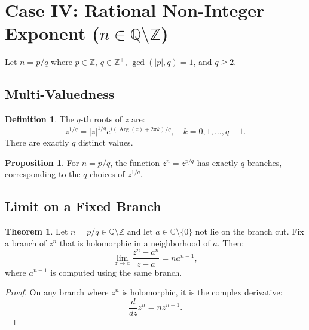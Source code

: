 \documentclass{article}
\theoremstyle{definition}
\newtheorem{definition}{Definition}[section]
\newtheorem{theorem}{Theorem}[section]
\newtheorem{proposition}{Proposition}[section]
\theoremstyle{remark}
\newcommand{\C}{\mathbb{C}}
\newcommand{\Z}{\mathbb{Z}}
\newcommand{\Q}{\mathbb{Q}}
\newcommand{\Arg}{\operatorname{Arg}}
\begin{document}
\section{Case IV: Rational Non-Integer Exponent ($n \in \Q \setminus \Z$)}

Let $n = p/q$ where $p \in \Z$, $q \in \Z^+$, $\gcd(|p|, q) = 1$, and $q \geq 2$.

\subsection{Multi-Valuedness}

\begin{definition}
The $q$-th roots of $z$ are:
\begin{equation}
z^{1/q} = |z|^{1/q} e^{i(\Arg(z) + 2\pi k)/q}, \quad k = 0, 1, \ldots, q-1.
\end{equation}
There are exactly $q$ distinct values.
\end{definition}

\begin{proposition}
For $n = p/q$, the function $z^n = z^{p/q}$ has exactly $q$ branches, corresponding to the $q$ choices of $z^{1/q}$.
\end{proposition}

\subsection{Limit on a Fixed Branch}

\begin{theorem}
Let $n = p/q \in \Q \setminus \Z$ and let $a \in \C \setminus \{0\}$ not lie on the branch cut. Fix a branch of $z^n$ that is holomorphic in a neighborhood of $a$. Then:
\begin{equation}
\lim_{z \to a} \frac{z^n - a^n}{z - a} = n a^{n-1},
\end{equation}
where $a^{n-1}$ is computed using the same branch.
\end{theorem}

\begin{proof}
On any branch where $z^n$ is holomorphic, it is the complex derivative:
\begin{equation}
\frac{d}{dz} z^n = n z^{n-1}.
\end{equation}
\end{proof}
\end{document}
